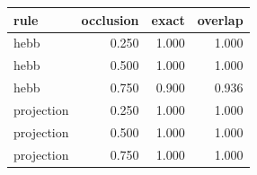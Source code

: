 \begin{tabular}{lrrr}
\toprule
rule & occlusion & exact & overlap \\
\midrule
hebb & 0.250 & 1.000 & 1.000 \\
hebb & 0.500 & 1.000 & 1.000 \\
hebb & 0.750 & 0.900 & 0.936 \\
projection & 0.250 & 1.000 & 1.000 \\
projection & 0.500 & 1.000 & 1.000 \\
projection & 0.750 & 1.000 & 1.000 \\
\bottomrule
\end{tabular}
